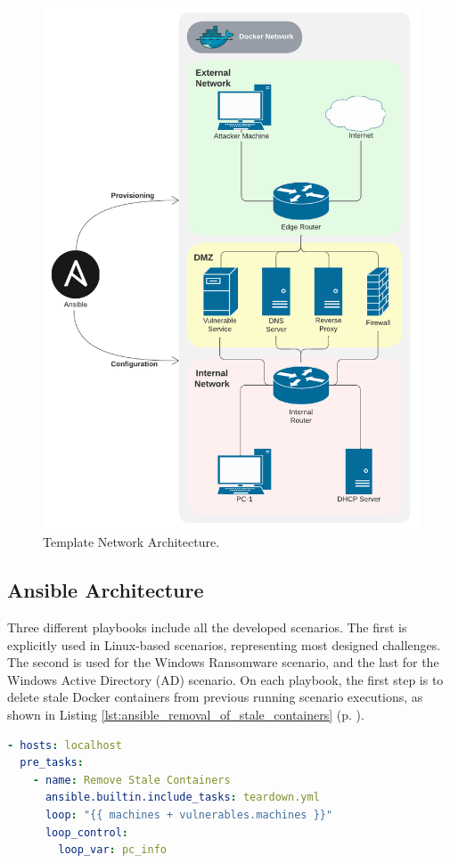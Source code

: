 \begin{figure}[H]
    \includegraphics[width=12cm]{figures/example.pdf}
    \caption{Template Network Architecture.}
    \label{fig:template_net}
\end{figure}

\subsection{Ansible Architecture} \label{sec:ansible_structure}

Three different playbooks include all the developed scenarios. The first is explicitly used in Linux-based scenarios, representing most designed challenges. The second is used for the Windows Ransomware scenario, and the last for the Windows Active Directory (AD) scenario. On each playbook, the first step is to delete stale Docker containers from previous running scenario executions, as shown in Listing \ref{lst:ansible_removal_of_stale_containers} (p. \pageref{lst:ansible_removal_of_stale_containers}).

\begin{lstlisting}[language=yaml,caption=Removal of Stale Containers.,numbers=none,label={lst:ansible_removal_of_stale_containers}]
- hosts: localhost
  pre_tasks:
    - name: Remove Stale Containers
      ansible.builtin.include_tasks: teardown.yml
      loop: "{{ machines + vulnerables.machines }}"
      loop_control:
        loop_var: pc_info
\end{lstlisting}

